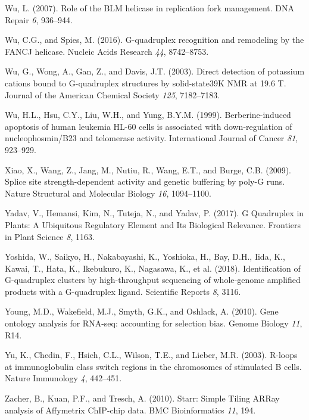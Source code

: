 \documentclass[12pt,a4paper,]{report}
\begin{document}
\leavevmode\hypertarget{ref-Wu2007}{}%
Wu, L. (2007). Role of the BLM helicase in replication fork management.
DNA Repair \emph{6}, 936--944.

\leavevmode\hypertarget{ref-Wu2016}{}%
Wu, C.G., and Spies, M. (2016). G-quadruplex recognition and remodeling
by the FANCJ helicase. Nucleic Acids Research \emph{44}, 8742--8753.

\leavevmode\hypertarget{ref-Wu2003}{}%
Wu, G., Wong, A., Gan, Z., and Davis, J.T. (2003). Direct detection of
potassium cations bound to G-quadruplex structures by solid-state39K NMR
at 19.6 T. Journal of the American Chemical Society \emph{125},
7182--7183.

\leavevmode\hypertarget{ref-Wu1999}{}%
Wu, H.L., Hsu, C.Y., Liu, W.H., and Yung, B.Y.M. (1999).
Berberine-induced apoptosis of human leukemia HL-60 cells is associated
with down-regulation of nucleophosmin/B23 and telomerase activity.
International Journal of Cancer \emph{81}, 923--929.

\leavevmode\hypertarget{ref-Xiao2009}{}%
Xiao, X., Wang, Z., Jang, M., Nutiu, R., Wang, E.T., and Burge, C.B.
(2009). Splice site strength-dependent activity and genetic buffering by
poly-G runs. Nature Structural and Molecular Biology \emph{16},
1094--1100.

\leavevmode\hypertarget{ref-Yadav2017}{}%
Yadav, V., Hemansi, Kim, N., Tuteja, N., and Yadav, P. (2017). G
Quadruplex in Plants: A Ubiquitous Regulatory Element and Its Biological
Relevance. Frontiers in Plant Science \emph{8}, 1163.

\leavevmode\hypertarget{ref-Yoshida2018}{}%
Yoshida, W., Saikyo, H., Nakabayashi, K., Yoshioka, H., Bay, D.H., Iida,
K., Kawai, T., Hata, K., Ikebukuro, K., Nagasawa, K., et al. (2018).
Identification of G-quadruplex clusters by high-throughput sequencing of
whole-genome amplified products with a G-quadruplex ligand. Scientific
Reports \emph{8}, 3116.

\leavevmode\hypertarget{ref-Young2010}{}%
Young, M.D., Wakefield, M.J., Smyth, G.K., and Oshlack, A. (2010). Gene
ontology analysis for RNA-seq: accounting for selection bias. Genome
Biology \emph{11}, R14.

\leavevmode\hypertarget{ref-Yu2003}{}%
Yu, K., Chedin, F., Hsieh, C.L., Wilson, T.E., and Lieber, M.R. (2003).
R-loops at immunoglobulin class switch regions in the chromosomes of
stimulated B cells. Nature Immunology \emph{4}, 442--451.

\leavevmode\hypertarget{ref-Zacher2010}{}%
Zacher, B., Kuan, P.F., and Tresch, A. (2010). Starr: Simple Tiling
ARRay analysis of Affymetrix ChIP-chip data. BMC Bioinformatics
\emph{11}, 194.
\end{document}
